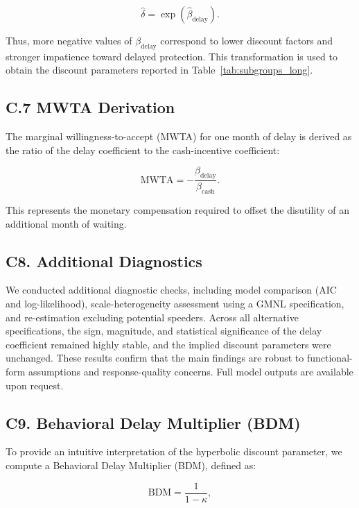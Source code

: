 \[
\hat{\delta} = \exp\!\left(\hat{\beta}_{\text{delay}}\right).
\]


Thus, more negative values of $\beta_{\text{delay}}$ correspond to lower discount factors and 
stronger impatience toward delayed protection. This transformation is used to obtain the 
discount parameters reported in Table~\ref{tab:subgroups_long}.

\subsection*{C.7 MWTA Derivation}

The marginal willingness-to-accept (MWTA) for one month of delay is derived as the 
ratio of the delay coefficient to the cash-incentive coefficient:

\[
\text{MWTA} = -\frac{\beta_{\text{delay}}}{\beta_{\text{cash}}}.
\]

This represents the monetary compensation required to offset the disutility of an 
additional month of waiting.



\subsection*{C8. Additional Diagnostics}

We conducted additional diagnostic checks, including model comparison (AIC and
log-likelihood), scale-heterogeneity assessment using a GMNL specification, and
re-estimation excluding potential speeders. Across all alternative specifications, the sign,
magnitude, and statistical significance of the delay coefficient remained highly stable,
and the implied discount parameters were unchanged. These results confirm that the
main findings are robust to functional-form assumptions and response-quality concerns.
Full model outputs are available upon request.



\subsection*{C9. Behavioral Delay Multiplier (BDM)}

To provide an intuitive interpretation of the hyperbolic discount parameter, we compute a
Behavioral Delay Multiplier (BDM), defined as:

\[
\mathrm{BDM} = \frac{1}{1 - \hat{\kappa}}, \tag{C11}
\]

